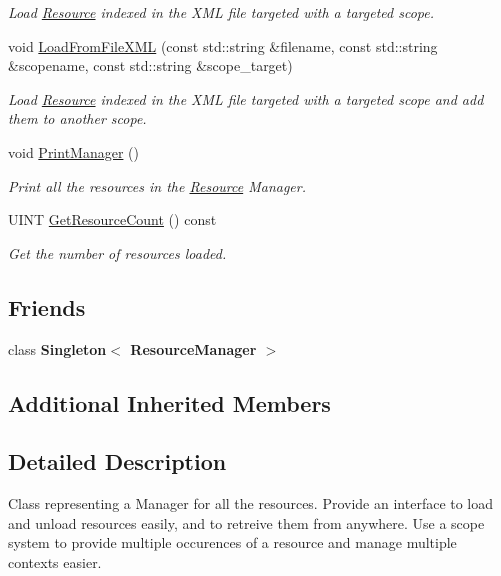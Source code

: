 \begin{DoxyCompactItemize}
\begin{DoxyCompactList}\small\item\em Load \mbox{\hyperlink{classsfmlbe_1_1_resource}{Resource}} indexed in the X\+ML file targeted with a targeted scope. \end{DoxyCompactList}\item 
void \mbox{\hyperlink{classsfmlbe_1_1_resource_manager_a99707b50bdf61ac1daadd65027a1ae2b}{Load\+From\+File\+X\+ML}} (const std\+::string \&filename, const std\+::string \&scopename, const std\+::string \&scope\+\_\+target)
\begin{DoxyCompactList}\small\item\em Load \mbox{\hyperlink{classsfmlbe_1_1_resource}{Resource}} indexed in the X\+ML file targeted with a targeted scope and add them to another scope. \end{DoxyCompactList}\item 
void \mbox{\hyperlink{classsfmlbe_1_1_resource_manager_a74e64d1b098dcdbc0ee4fd8925303523}{Print\+Manager}} ()
\begin{DoxyCompactList}\small\item\em Print all the resources in the \mbox{\hyperlink{classsfmlbe_1_1_resource}{Resource}} Manager. \end{DoxyCompactList}\item 
U\+I\+NT \mbox{\hyperlink{classsfmlbe_1_1_resource_manager_a99c69873bb1084afe35a97986c657ee9}{Get\+Resource\+Count}} () const
\begin{DoxyCompactList}\small\item\em Get the number of resources loaded. \end{DoxyCompactList}\end{DoxyCompactItemize}
\subsection*{Friends}
\begin{DoxyCompactItemize}
\item 
\mbox{\label{classsfmlbe_1_1_resource_manager_a8cc0c523af7e6e454ed0f273b5f18e4a}} 
class {\bfseries Singleton$<$ Resource\+Manager $>$}
\end{DoxyCompactItemize}
\subsection*{Additional Inherited Members}


\subsection{Detailed Description}
Class representing a Manager for all the resources. Provide an interface to load and unload resources easily, and to retreive them from anywhere. Use a scope system to provide multiple occurences of a resource and manage multiple contexts easier. 

